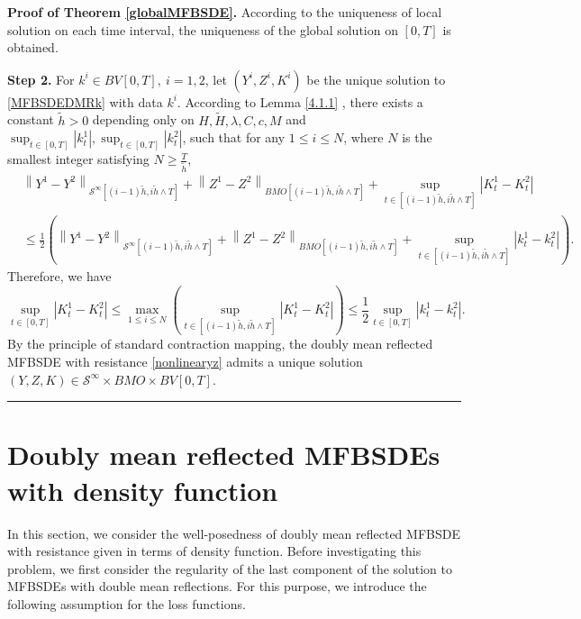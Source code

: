 \documentclass[10pt]{article}%
\numberwithin{equation}{section}
\newtheorem{remark}[theorem]{Remark}
\newenvironment{proof}[1][Proof]{\noindent \textbf{#1.} }{\  \rule{0.5em}{0.5em}}
\begin{document}
\begin{proof}[Proof of Theorem \ref{globalMFBSDE}]
According to the uniqueness of local solution on each time interval, the uniqueness of the global solution on $[0,T]$ is obtained.

{\bf Step 2.} For $k^i\in BV[0,T],\ i=1,2$, let $(Y^i,Z^i,K^i)$ be the unique solution to \eqref{MFBSDEDMRk} with data $k^i$. According to Lemma \ref{4.1.1} , there exists a constant $\tilde{h}>0$ depending only on $H,\tilde{H},\lambda, C,c,M$ and $\sup_{t\in[0,T]}\left|k_t^1\right|, \sup_{t\in[0,T]}\left|k_t^2\right|$, such that for any $1 \leq i \leq N$, where $N$ is the smallest integer satisfying $N\geq \frac{T}{\tilde{h}}$,
$$
\begin{aligned}
  &\left\|Y^{1}-Y^{2}\right\|_{\mathcal{S}^{\infty}[(i-1)\tilde{h},i\tilde{h} \wedge T]}+\left\|Z^{1}-Z^{2}\right\|_{BMO[(i-1)\tilde{h},i\tilde{h} \wedge T]}+\sup_{t\in[(i-1)\tilde{h},i\tilde{h} \wedge T]}\left|K_{t}^{1}-K_{t}^{2}\right|\\
  &\leq \frac{1}{2} \left(\left\|Y^{1}-Y^{2}\right\|_{\mathcal{S}^{\infty}[(i-1)\tilde{h},i\tilde{h} \wedge T]}+\left\|Z^{1}-Z^{2}\right\|_{BMO[(i-1)\tilde{h},i\tilde{h} \wedge T]}+\sup_{t\in[(i-1)\tilde{h},i\tilde{h} \wedge T]}\left|k_t^1-k_t^2\right|\right).
\end{aligned}
$$
Therefore, we have 
$$\sup_{t\in[0,T]}\left|K_t^1-K_t^2\right|\leq \max_{1\leq i \leq N}\left(\sup_{t\in[(i-1)\tilde{h},i\tilde{h} \wedge T]}\left|K_t^1-K_t^2\right|\right)\leq \frac{1}{2}\sup_{t\in[0,T]}\left|k_t^1-k_t^2\right|.$$
By the principle of standard contraction mapping, the doubly mean reflected MFBSDE with resistance \eqref{nonlinearyz} admits a unique solution $(Y,Z,K)\in\mathcal{S}^{\infty}\times BMO \times BV[0,T]$. 
\end{proof}



   
\section{Doubly mean reflected MFBSDEs with density function}
In this section, we consider the well-posedness of doubly mean reflected MFBSDE with resistance given in terms of density function. Before investigating this problem, we first consider the regularity of the last component of the solution  to MFBSDEs with double mean reflections. For this purpose, we introduce the following assumption for the loss functions.
\end{document}
